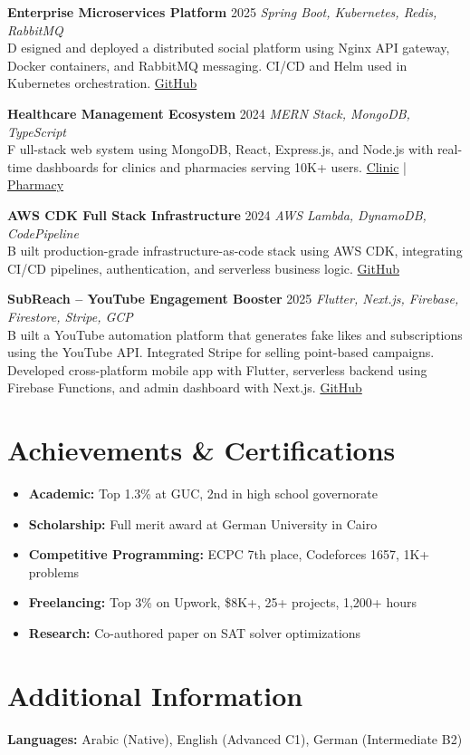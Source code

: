 \documentclass[8pt,a4paper]{article}
\newcommand{\cventry}[4]{%
    \textbf{#1} \hfill {\small\color{secondarycolor} #2} \hfill {\footnotesize\textit{#3}}\\
    #4
    \vspace{0.02em}
}
\newcommand{\skillsection}[2]{%
    \textbf{#1:} #2\\[-0.02em]
}
\begin{document}
\cventry{Enterprise Microservices Platform}{2025}{Spring Boot, Kubernetes, Redis, RabbitMQ}
Designed and deployed a distributed social platform using Nginx API gateway, Docker containers, and RabbitMQ messaging. CI/CD and Helm used in Kubernetes orchestration. \href{https://github.com/mariamhmostafa/FinalProject-29-Cache_Me_If_You_Can}{GitHub}

\cventry{Healthcare Management Ecosystem}{2024}{MERN Stack, MongoDB, TypeScript}
Full-stack web system using MongoDB, React, Express.js, and Node.js with real-time dashboards for clinics and pharmacies serving 10K+ users. \href{https://github.com/advanced-computer-lab-2023/Copilot-and-Sons-Clinic}{Clinic} | \href{https://github.com/advanced-computer-lab-2023/Copilot-and-Sons-Pharmacy}{Pharmacy}

\cventry{AWS CDK Full Stack Infrastructure}{2024}{AWS Lambda, DynamoDB, CodePipeline}
Built production-grade infrastructure-as-code stack using AWS CDK, integrating CI/CD pipelines, authentication, and serverless business logic. \href{https://github.com/ramezlahzy/cdk_fullstack_app}{GitHub}

\cventry{SubReach – YouTube Engagement Booster}{2025}{Flutter, Next.js, Firebase, Firestore, Stripe, GCP}
Built a YouTube automation platform that generates fake likes and subscriptions using the YouTube API. Integrated Stripe for selling point-based campaigns. Developed cross-platform mobile app with Flutter, serverless backend using Firebase Functions, and admin dashboard with Next.js.
\href{https://github.com/ramezlahzy/SubReach}{GitHub}



\section{Achievements \& Certifications}
\begin{itemize}
    \item \textbf{Academic:} Top 1.3\% at GUC, 2nd in high school governorate
    \item \textbf{Scholarship:} Full merit award at German University in Cairo
    \item \textbf{Competitive Programming:} ECPC 7th place, Codeforces 1657, 1K+ problems
    \item \textbf{Freelancing:} Top 3\% on Upwork, \$8K+, 25+ projects, 1,200+ hours
    \item \textbf{Research:} Co-authored paper on SAT solver optimizations
\end{itemize}

\section{Additional Information}

\skillsection{Languages}{Arabic (Native), English (Advanced C1), German (Intermediate B2)}
\end{document}
